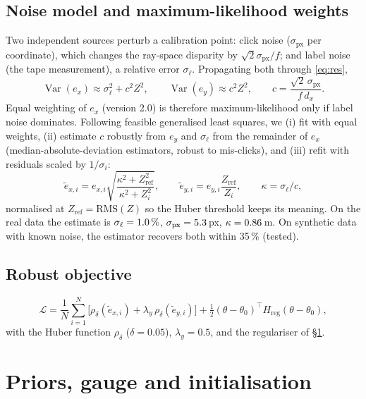 \documentclass[11pt,a4paper]{article}
\begin{document}
\subsection{Noise model and maximum-likelihood weights}\label{sec:noise}
Two independent sources perturb a calibration point: click noise ($\sigma_\text{px}$ per coordinate), which
changes the ray-space disparity by $\sqrt2\sigma_\text{px}/f$; and label noise (the tape measurement), a relative
error $\sigma_\ell$. Propagating both through \eqref{eq:res},
\begin{equation}\label{eq:var}
\operatorname{Var}(e_x)\approx\sigma_\ell^2+c^2Z^2,\qquad \operatorname{Var}(e_y)\approx c^2Z^2,\qquad
c=\frac{\sqrt2\,\sigma_\text{px}}{f\,d_x}.
\end{equation}
Equal weighting of $e_x$ (version 2.0) is therefore maximum-likelihood only if label noise dominates.
Following feasible generalised least squares, we (i) fit with equal weights, (ii) estimate $c$ robustly from $e_y$
and $\sigma_\ell$ from the remainder of $e_x$ (median-absolute-deviation estimators, robust to mis-clicks), and
(iii) refit with residuals scaled by $1/\sigma_i$:
\begin{equation}
\tilde e_{x,i}=e_{x,i}\sqrt{\frac{\kappa^2+Z_\text{ref}^2}{\kappa^2+Z_i^2}},\qquad
\tilde e_{y,i}=e_{y,i}\frac{Z_\text{ref}}{Z_i},\qquad \kappa=\sigma_\ell/c,
\end{equation}
normalised at $Z_\text{ref}=\text{RMS}(Z)$ so the Huber threshold keeps its meaning. On the real data the
estimate is $\sigma_\ell=1.0\,\%$, $\sigma_\text{px}=5.3$\,px, $\kappa=0.86$\,m. On synthetic data
with known noise, the estimator recovers both within 35\,\% (tested).

\subsection{Robust objective}
\begin{equation}\label{eq:loss}
\mathcal L=\frac1N\sum_{i=1}^{N}\Big[\rho_\delta(\tilde e_{x,i})+\lambda_y\,\rho_\delta(\tilde e_{y,i})\Big]
+\tfrac12(\theta-\theta_0)^\top H_\text{reg}(\theta-\theta_0),
\end{equation}
with the Huber function $\rho_\delta$ ($\delta=0.05$), $\lambda_y=0.5$, and the regulariser of \S\ref{sec:reg}.

\section{Priors, gauge and initialisation}\label{sec:reg}
\end{document}
